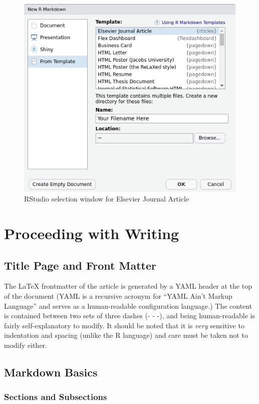 \documentclass[]{elsarticle} %
\begin{document}
\begin{figure}[H]

{\centering \includegraphics[width=0.6\linewidth,]{Figures/Figure1} 

}

\caption{RStudio selection window for Elsevier Journal Article}\label{fig:fig1}
\end{figure}

\hypertarget{proceeding-with-writing}{%
\section{Proceeding with Writing}\label{proceeding-with-writing}}

\hypertarget{title-page-and-front-matter}{%
\subsection{Title Page and Front
Matter}\label{title-page-and-front-matter}}

The LaTeX frontmatter of the article is generated by a YAML header at
the top of the document (YAML is a recursive acronym for ``YAML Ain't
Markup Language'' and serves as a human-readable configuration
language.) The content is contained between two sets of three dashes (-
- -), and being human-readable is fairly self-explanatory to modify. It
should be noted that it is \emph{very} sensitive to indentation and
spacing (unlike the R language) and care must be taken not to modify
either.

\hypertarget{markdown-basics}{%
\subsection{Markdown Basics}\label{markdown-basics}}

\hypertarget{sections-and-subsections}{%
\subsubsection{Sections and
Subsections}\label{sections-and-subsections}}
\end{document}
